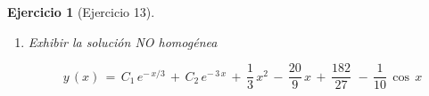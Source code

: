 \documentclass[a4paper,11pt, openany]{book}
\newtheorem{ejer}{Ejercicio}[section]
\newcommand*{\itembolasazules}[1]{%
\footnotesize\protect\tikz[baseline=-3pt]%
\protect\node[scale=.7, circle, shade, ball
color=green]{\color{white}\Large\bf#1};}
\begin{document}
\begin{ejer}[Ejercicio 13]
\begin{enumerate}[label=\itembolasazules{\arabic*}]
$$2\,-\,\dfrac{200}{9}\,=\,-\,3\,K_{0} \quad \textcolor{aurometalsaurus}{\iff} \quad -\,\dfrac{182}{9}\,=\,-\,3\,K_{0} \quad \textcolor{aurometalsaurus}{\iff} \quad \boxed{K_{0}\,=\,\dfrac{182}{27}}$$
 
$$\cos\,x: \qquad 10\,M\,=\,0 \quad \textcolor{aurometalsaurus}{\iff} \quad \boxed{M\,=\,0}$$
 
$$\sin\,x: \qquad -\,10\,N\,=\,1 \quad \textcolor{aurometalsaurus}{\iff} \quad \boxed{N\,=\,-\,\dfrac{1}{10}}$$
 
\item Exhibir la solución NO homogénea 
 
$$\boxed{y\,(x)\,=\,C_{1}\,e^{-\,x/3}\,+\,C_{2}\,e^{-\,3\,x}\,+\,\dfrac{1}{3}\,x^{2}\,-\,\dfrac{20}{9}\,x\,+\,\dfrac{182}{27}\,\,-\,\dfrac{1}{10}\,\cos\,x} $$
 
\end{enumerate}

\end{ejer}
 
\end{document}
